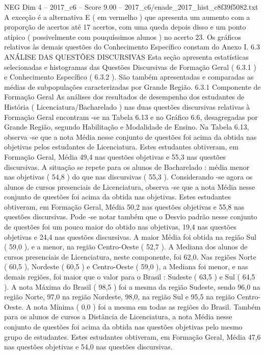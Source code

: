 \begin{textsample}{NEG Dim 4 – 2017\_c6 – Score 9.00 – 2017\_c6/enade\_2017\_hist\_c8f39f5082.txt}
A exceção é a alternativa E ( em vermelho ) que apresenta um aumento com a proporção de acertos até 17 acertos, com uma queda depois disso e um ponto atípico ( possivelmente com pouquíssimos alunos ) no acerto 23.
Os gráficos relativos às demais questões do Conhecimento Específico constam do Anexo I. 6.3 ANÁLISE DAS QUESTÕES DISCURSIVAS Esta seção apresenta estatísticas selecionadas e histogramas das Questões Discursivas de Formação Geral ( 6.3.1 ) e Conhecimento Específico ( 6.3.2 ).
São também apresentadas e comparadas as médias de subpopulações caracterizadas por Grande Região. 6.3.1 Componente de Formação Geral As análises dos resultados de desempenho dos estudantes de História ( Licenciatura/Bacharelado ) nas duas questões discursivas relativas à Formação Geral encontram -se na Tabela 6.13 e no Gráfico 6.6, desagregadas por Grande Região, segundo Habilitação e Modalidade de Ensino.
Na Tabela 6.13, observa -se que a nota Média nesse conjunto de questões foi acima da obtida nas objetivas pelos estudantes de Licenciatura.
Estes estudantes obtiveram, em Formação Geral, Média 49,4 nas questões objetivas e 55,3 nas questões discursivas.
A situação se repete para os alunos de Bacharelado : média menor nas objetivas ( 54,8 ) do que nas discursivas ( 55,3 ).
Considerando -se agora os alunos de cursos presenciais de Licenciatura, observa -se que a nota Média nesse conjunto de questões foi acima da obtida nas objetivas.
Estes estudantes obtiveram, em Formação Geral, Média 50,2 nas questões objetivas e 55,8 nas questões discursivas.
Pode -se notar também que o Desvio padrão nesse conjunto de questões foi um pouco maior do obtido nas objetivas, 19,4 nas questões objetivas e 24,4 nas questões discursivas.
A maior Média foi obtida na região Sul ( 59,0 ), e a menor, na região Centro-Oeste ( 52,7 ).
A Mediana dos alunos de cursos presenciais de Licenciatura, neste componente, foi 62,0.
Nas regiões Norte ( 60,5 ), Nordeste ( 60,5 ) e Centro-Oeste ( 59,0 ), a Mediana foi menor, e nas demais regiões, foi maior que o valor para o Brasil : Sudeste ( 63,5 ) e Sul ( 64,5 ).
A nota Máxima do Brasil ( 98,5 ) foi a mesma da região Sudeste, sendo 96,0 na região Norte, 97,0 na região Nordeste, 98,0, na região Sul e 95,5 na região Centro-Oeste.
A nota Mínima ( 0,0 ) foi a mesma em todas as regiões do Brasil.
Também para os alunos de cursos a Distância de Licenciatura, a nota Média nesse conjunto de questões foi acima da obtida nas questões objetivas pelo mesmo grupo de estudantes.
Estes estudantes obtiveram, em Formação Geral, Média 47,6 nas questões objetivas e 54,0 nas questões discursivas.

\end{textsample}
